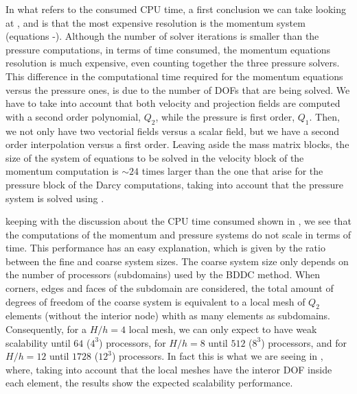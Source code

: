 In what refers to the consumed CPU time, a first conclusion we can take looking at ,  and  is that the most expensive resolution is the momentum system (equations -). Although the number of solver iterations is smaller than the pressure computations, in terms of time consumed, the momentum equations resolution is much expensive, even counting together the three pressure solvers. This difference in the computational time required for the momentum equations versus the pressure ones, is due to the number of DOFs that are being solved. We have to take into account that both velocity and projection fields are computed with a second order polynomial, $ Q_2 $, while the pressure is first order, $ Q_1 $. Then, we not only have two vectorial fields versus a scalar field, but we have a second order interpolation versus a first order. Leaving aside the mass matrix blocks, the size of the system of equations to be solved in the velocity block of the momentum computation is $ \sim24 $ times larger than the one that arise for the pressure block of the Darcy computations, taking into account that the pressure system is solved using .

keeping with the discussion about the CPU time consumed shown in , we see that the computations of the momentum and pressure systems do not scale in terms of time. This performance has an easy explanation, which is given by the ratio between the fine and coarse system sizes. The coarse system size only depends on the number of processors (subdomains) used by the BDDC method. When corners, edges and faces of the subdomain are considered, the total amount of degrees of freedom of the coarse system is equivalent to a local mesh of $ Q_2 $ elements (without the interior node) whith as many elements as subdomains. Consequently, for a $ H/h=4 $ local mesh, we can only expect to have weak scalability until $ 64 $ ($ 4^3 $) processors, for $ H/h=8 $ until $ 512 $ ($ 8^3 $) processors, and for $ H/h=12 $ until $ 1728 $ ($ 12^3 $) processors. In fact this is what we are seeing in , where, taking into account that the local meshes have the interor DOF inside each element, the results show the expected scalability performance.

